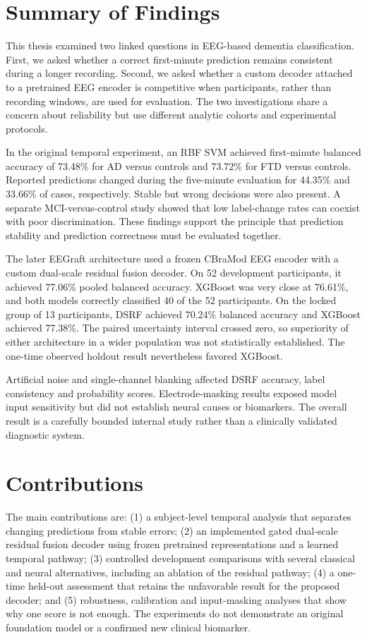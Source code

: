 \section{Summary of Findings}
This thesis examined two linked questions in EEG-based dementia classification. First, we asked whether a correct first-minute prediction remains consistent during a longer recording. Second, we asked whether a custom decoder attached to a pretrained EEG encoder is competitive when participants, rather than recording windows, are used for evaluation. The two investigations share a concern about reliability but use different analytic cohorts and experimental protocols.

In the original temporal experiment, an RBF SVM achieved first-minute balanced accuracy of 73.48\% for AD versus controls and 73.72\% for FTD versus controls. Reported predictions changed during the five-minute evaluation for 44.35\% and 33.66\% of cases, respectively. Stable but wrong decisions were also present. A separate MCI-versus-control study showed that low label-change rates can coexist with poor discrimination. These findings support the principle that prediction stability and prediction correctness must be evaluated together.

The later EEGraft architecture used a frozen CBraMod EEG encoder with a custom dual-scale residual fusion decoder. On 52 development participants, it achieved 77.06\% pooled balanced accuracy. XGBoost was very close at 76.61\%, and both models correctly classified 40 of the 52 participants. On the locked group of 13 participants, DSRF achieved 70.24\% balanced accuracy and XGBoost achieved 77.38\%. The paired uncertainty interval crossed zero, so superiority of either architecture in a wider population was not statistically established. The one-time observed holdout result nevertheless favored XGBoost.

Artificial noise and single-channel blanking affected DSRF accuracy, label consistency and probability scores. Electrode-masking results exposed model input sensitivity but did not establish neural causes or biomarkers. The overall result is a carefully bounded internal study rather than a clinically validated diagnostic system.

\section{Contributions}
The main contributions are: (1) a subject-level temporal analysis that separates changing predictions from stable errors; (2) an implemented gated dual-scale residual fusion decoder using frozen pretrained representations and a learned temporal pathway; (3) controlled development comparisons with several classical and neural alternatives, including an ablation of the residual pathway; (4) a one-time held-out assessment that retains the unfavorable result for the proposed decoder; and (5) robustness, calibration and input-masking analyses that show why one score is not enough. The experiments do not demonstrate an original foundation model or a confirmed new clinical biomarker.

